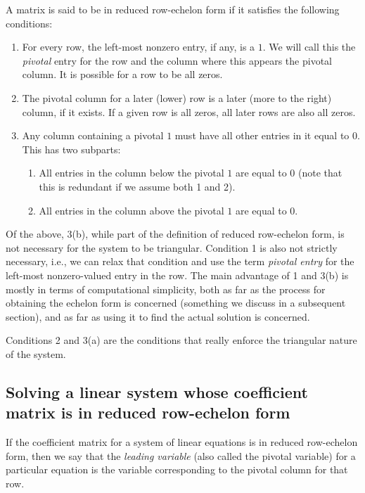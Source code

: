 \documentclass[10pt]{amsart}
\begin{document}
A matrix is said to be in reduced row-echelon form if it satisfies the
following conditions:

\begin{enumerate}
\item For every row, the left-most nonzero entry, if any, is a $1$. We
  will call this the {\em pivotal} entry for the row and the column
  where this appears the pivotal column. It is possible for a row to
  be all zeros.
\item The pivotal column for a later (lower) row is a later (more to
  the right) column, if it exists. If a given row is all zeros, all
  later rows are also all zeros.
\item Any column containing a pivotal $1$ must have all other entries
  in it equal to $0$. This has two subparts:

  \begin{enumerate}
  \item All entries in the column below the pivotal $1$ are equal to
    $0$ (note that this is redundant if we assume both 1 and 2).
  \item All entries in the column above the pivotal $1$ are equal to $0$.
  \end{enumerate}
\end{enumerate}

Of the above, 3(b), while part of the definition of reduced
row-echelon form, is not necessary for the system to be
triangular. Condition 1 is also not strictly necessary, i.e., we can
relax that condition and use the term {\em pivotal entry} for the
left-most nonzero-valued entry in the row. The main advantage of 1 and
3(b) is mostly in terms of computational simplicity, both as far as
the process for obtaining the echelon form is concerned (something we
discuss in a subsequent section), and as far as using it to find the
actual solution is concerned.

Conditions 2 and 3(a) are the conditions that really enforce the
triangular nature of the system.

\subsection{Solving a linear system whose coefficient matrix is in reduced row-echelon form}

If the coefficient matrix for a system of linear equations is in
reduced row-echelon form, then we say that the {\em leading variable}
(also called the pivotal variable) for a particular equation is the
variable corresponding to the pivotal column for that row.
\end{document}
